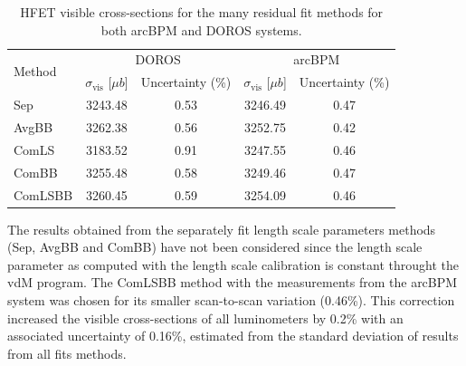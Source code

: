 
\begin{table}[!htb]
    \centering
    \caption{HFET visible cross-sections for the many residual fit methods for both arcBPM and DOROS systems.}
    \label{tb:hfet_rod_xsec}
    \begin{tabular}{lcc|cc}
        \hline
        \multirow{2}{*}{Method} & \multicolumn{2}{c|}{DOROS} & \multicolumn{2}{c}{arcBPM} \\
        \cline{2-5}
         & $\sigma_{\mathrm{vis}}$ [$\mu b$] & Uncertainty (\%) & $\sigma_{\mathrm{vis}}$ [$\mu b$] & Uncertainty (\%) \\
        \hline
        Sep     & 3243.48 & 0.53 & 3246.49 & 0.47 \\
        AvgBB   & 3262.38 & 0.56 & 3252.75 & 0.42 \\
        ComLS   & 3183.52 & 0.91 & 3247.55 & 0.46 \\
        ComBB   & 3255.48 & 0.58 & 3249.46 & 0.47 \\
        ComLSBB & 3260.45 & 0.59 & 3254.09 & 0.46 \\
        \hline
    \end{tabular}
\end{table}


The results obtained from the separately fit length scale parameters methods (Sep, AvgBB and ComBB) have not been considered since the length scale parameter as computed with the length scale calibration is constant throught the vdM program. The ComLSBB method with the measurements from the arcBPM system was chosen for its smaller scan-to-scan variation (0.46\%). This correction increased the visible cross-sections of all luminometers by 0.2\% with an associated uncertainty of 0.16\%, estimated from the standard deviation of results from all fits methods.

